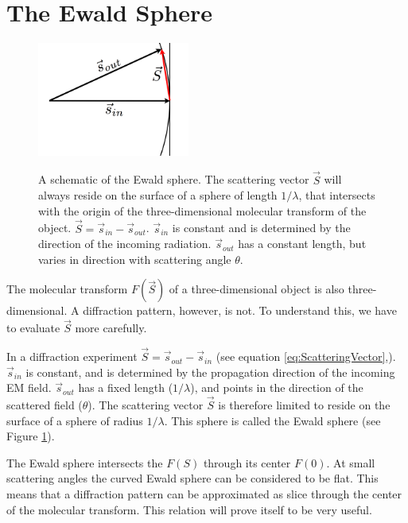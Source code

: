 \section{The Ewald Sphere}

\begin{figure}[h]
	\centering 
	\includegraphics[width=50mm]{Chapter_02_EwaldSphere.png}
	\label{fig:EwaldSphere}
	\caption{A schematic of the Ewald sphere. The scattering vector $\vec{S}$ will always reside on the surface of a sphere of length $1/\lambda$, that intersects with the origin of the three-dimensional molecular transform of the object. $\vec{S} = \vec{s}_{in} - \vec{s}_{out}$. $\vec{s}_{in}$ is constant and is determined by the direction of the incoming radiation. $\vec{s}_{out}$ has a constant length, but varies in direction with scattering angle $\theta$. }
\end{figure}

The molecular transform $F(\vec{S})$ of a three-dimensional object is also three-dimensional. A diffraction pattern, however, is not. To understand this, we have to evaluate $\vec{S}$ more carefully. 

In a diffraction experiment $\vec{S} = \vec{s}_{out} -\vec{s}_{in}$ (see equation \ref{eq:ScatteringVector},). $\vec{s}_{in}$ is constant, and is determined by the propagation direction of the incoming EM field. $\vec{s}_{out}$ has a fixed length ($1/\lambda$), and points in the direction of the scattered field ($\theta$). The scattering vector $\vec{S}$ is therefore limited to reside on the surface of a sphere of radius $1/\lambda$. This sphere is called the Ewald sphere \cite{Ewald1969} (see Figure \ref{fig:EwaldSphere}). 


The Ewald sphere intersects the $F(S)$ through its center $F(0)$. At small scattering angles the curved Ewald sphere can be considered to be flat. This means that a diffraction pattern can be approximated as slice through the center of the molecular transform.  This relation will prove itself to be very useful.

